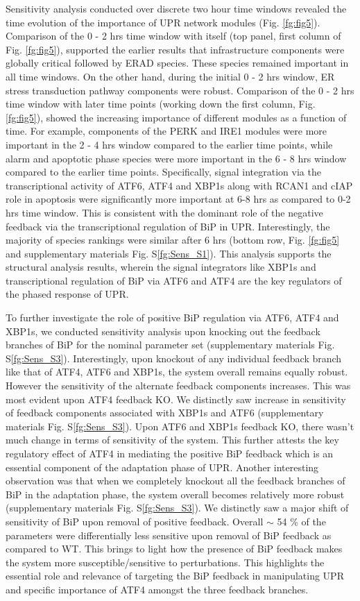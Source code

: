\documentclass[fleqn,10pt]{wlscirep}
\begin{document}
Sensitivity analysis conducted over discrete two hour time windows revealed the time evolution of the importance of UPR network modules (Fig. \ref{fg:fig5}). Comparison of the 0 - 2 hrs time window with itself (top panel, first column of Fig. \ref{fg:fig5}), supported the earlier results that infrastructure components were globally critical followed by ERAD species. These species remained important in all time windows. On the other hand, during the initial 0 - 2 hrs window, ER stress transduction pathway components were robust. Comparison of the 0 - 2 hrs time window with later time points (working down the first column, Fig. \ref{fg:fig5}), showed the increasing importance of different modules as a function of time. For example, components of the PERK and IRE1 modules were more important in the 2 - 4 hrs window compared to the earlier time points, while alarm and apoptotic phase species were more important in the 6 - 8 hrs window compared to the earlier time points. Specifically, signal integration via the transcriptional activity of ATF6, ATF4 and XBP1s along with RCAN1 and cIAP role in apoptosis were significantly more important at 6-8 hrs as compared to 0-2 hrs time window. This is consistent with the dominant role of the negative feedback via the transcriptional regulation of BiP in UPR. Interestingly, the majority of species rankings were similar after 6 hrs (bottom row,  Fig. \ref{fg:fig5} and supplementary materials Fig. S\ref{fg:Sens_S1}). This analysis supports the structural analysis results, wherein the signal integrators like XBP1s and transcriptional regulation of BiP via ATF6 and ATF4 are the key regulators of the phased response of UPR. 

To further investigate the role of positive BiP regulation via ATF6, ATF4 and XBP1s, we conducted sensitivity analysis upon knocking out the feedback branches of BiP for the nominal parameter set (supplementary materials Fig. S\ref{fg:Sens_S3}). Interestingly, upon knockout of any individual feedback branch like that of ATF4, ATF6 and XBP1s, the system overall remains equally robust. However the sensitivity of the alternate feedback components increases. This was most evident upon ATF4 feedback KO. We distinctly saw increase in sensitivity of feedback components associated with XBP1s and ATF6 (supplementary materials Fig. S\ref{fg:Sens_S3}). Upon ATF6 and XBP1s feedback KO, there wasn't much change in terms of sensitivity of the system. This further attests the key regulatory effect of ATF4 in mediating the positive BiP feedback which is an essential component of the adaptation phase of UPR. Another interesting observation was that when we completely knockout all the feedback branches of BiP in the adaptation phase, the system overall becomes relatively more robust (supplementary materials Fig. S\ref{fg:Sens_S3}). We distinctly saw a major shift of sensitivity of BiP upon removal of positive feedback. Overall $\sim$ 54 \% of the parameters were differentially less sensitive upon removal of BiP feedback as compared to WT. This brings to light how the presence of BiP feedback makes the system more susceptible/sensitive to perturbations. This highlights the essential role and relevance of targeting the BiP feedback in manipulating UPR and  specific importance of ATF4 amongst the three feedback branches.
 
\end{document}
